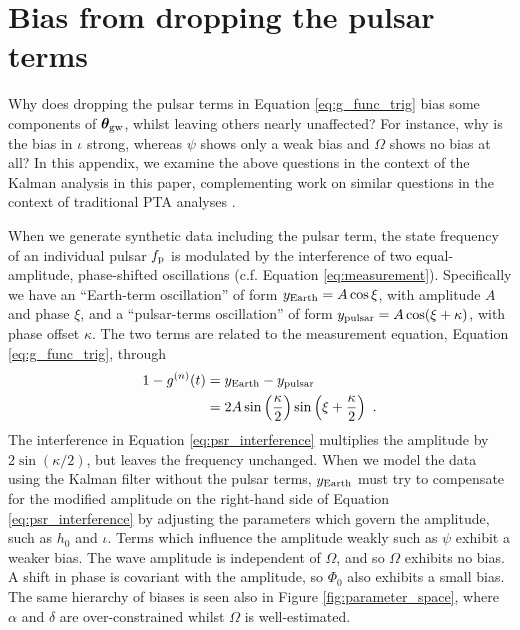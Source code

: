 \documentclass[fleqn,usenatbib,useAMS]{mnras}
\begin{document}
\section{Bias from dropping the pulsar terms}\label{sec:bias_appendix}
Why does dropping the pulsar terms in Equation \ref{eq:g_func_trig} bias some components of $\boldsymbol{\theta}_{\rm gw}$, whilst leaving others nearly unaffected? For instance, why is the bias in $\iota$ strong, whereas $\psi$ shows only a weak bias and  $\Omega$ shows no bias at all? In this appendix, we examine the above questions in the context of the Kalman analysis in this paper, complementing work on similar questions in the context of traditional PTA analyses \citep{Zhupulsarterms,Chen2022}. \newline  




 When we generate synthetic data including the pulsar term, the state frequency of an individual pulsar $f_{\rm p}$ is modulated by the interference of two equal-amplitude, phase-shifted oscillations (c.f. Equation \eqref{eq:measurement}). Specifically we have an 
``Earth-term oscillation'' of form $y_{\rm Earth} = A \cos \xi$, with amplitude $A$ and phase $\xi$, and a ``pulsar-terms oscillation'' of form $y_{\rm pulsar} = A \cos (\xi + \kappa)$, with phase offset $\kappa$. The two terms are related to the measurement equation, Equation \eqref{eq:g_func_trig}, through
\begin{align}
	1 - g^{(n)}(t) &=  y_{\rm Earth}  - y_{\rm pulsar} \  \nonumber \\
		 &= 2 A \sin \left(\frac{\kappa}{2}\right) \sin \left(\xi + \frac{\kappa}{2}\right) \ . \label{eq:psr_interference}
\end{align}
The interference in Equation \ref{eq:psr_interference} multiplies the amplitude by $ 2 \sin (\kappa/2)$, but leaves the frequency unchanged. When we model the data using the Kalman filter without the pulsar terms, $y_{\rm Earth}$ must try to compensate for the modified amplitude on the right-hand side of Equation \ref{eq:psr_interference} by adjusting the parameters which govern the amplitude, such as $h_0$ and $\iota$. Terms which influence the amplitude weakly such as $\psi$ exhibit a weaker bias. The wave amplitude is independent of $\Omega$, and so $\Omega$ exhibits no bias. A shift in phase is covariant with the amplitude, so $\Phi_0$ also exhibits a small bias. The same hierarchy of biases is seen also in Figure \ref{fig:parameter_space}, where $\alpha$ and $\delta$ are over-constrained whilst $\Omega$ is well-estimated. \newline  
\end{document}
